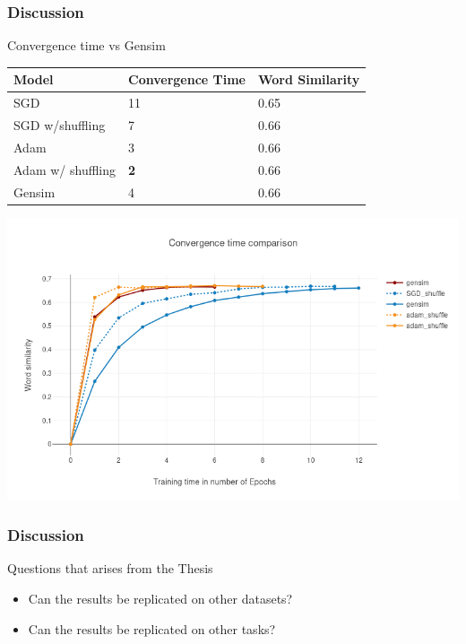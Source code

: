 \begin{frame}
\frametitle{Discussion}
Convergence time vs Gensim 
    \begin{table}[]
\begin{tabular}{|l|l|l|}
\hline
Model    & Convergence Time & Word Similarity \\ \hline
SGD & {11}              & 0.65            \\ \hline
SGD w/shuffling & {7}              & 0.66            \\ \hline
Adam & {3}              & 0.66            \\ \hline
Adam w/ shuffling & \textbf{2}              & 0.66      \\ \hline
Gensim   & 4          & 0.66            \\ \hline
\end{tabular}
\end{table}
\includegraphics[scale=0.25]{images/gensim_vs_adam}
  \end{frame}
  
  \begin{frame}
\frametitle{Discussion}
\begin{Large}
Questions that arises from the Thesis
\end{Large}
\begin{itemize}
\item Can the results be replicated on other datasets?
\item Can the results be replicated on other tasks? 
\end{itemize}
  \end{frame}